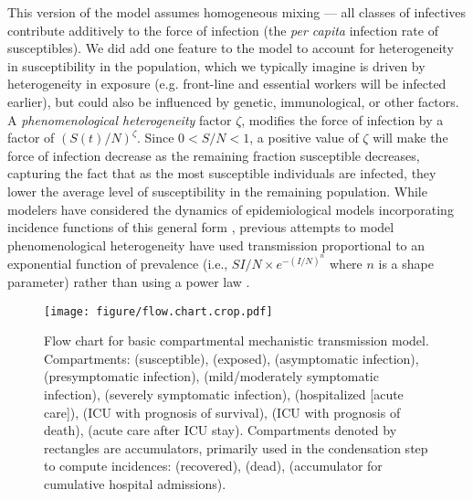 \documentclass[12pt]{article}\usepackage[]{graphicx}\usepackage[]{color}
\begin{document}
This version of the model assumes homogeneous mixing --- all classes of infectives contribute additively to the force of infection (the \emph{per capita} infection rate of susceptibles).
We did add one feature to the model to account for heterogeneity in susceptibility in the population, which we typically imagine is driven by heterogeneity in exposure (e.g. front-line and essential workers will be infected earlier), but could also be influenced by genetic, immunological, or other factors.
A \emph{phenomenological heterogeneity} factor $\zeta$, modifies the force of infection by a factor of $\left(S(t)/N\right)^\zeta$. Since $0 < S/N < 1$, a positive value of $\zeta$ will make the force of infection decrease as the remaining fraction susceptible decreases, capturing the fact that as the most susceptible individuals are infected, they lower the average level of susceptibility in the remaining population. While modelers have considered the dynamics of epidemiological models incorporating incidence functions of this general form \cite{WilsWorc+45,Liu+87}, previous attempts to model phenomenological heterogeneity have used transmission proportional to an exponential function of prevalence (i.e., $S I/N \times e^{-(I/N)^n}$ where $n$ is a shape parameter) rather than using a power law \cite{Will+06,Gran+09}. 

\begin{figure}
\color{fgcolor}
\texttt{[image: figure/flow.chart.crop.pdf]}
\caption{Flow chart for basic compartmental mechanistic transmission model. 
Compartments:  (susceptible),  (exposed),  (asymptomatic infection),  (presymptomatic infection),  (mild/moderately symptomatic infection),  (severely symptomatic infection),  (hospitalized [acute care]),  (ICU with prognosis of survival),  (ICU with prognosis of death),  (acute care after ICU stay). 
Compartments denoted by rectangles are accumulators, primarily used in the condensation step to compute incidences:  (recovered),  (dead),  (accumulator for cumulative hospital admissions).
}
\label{fig:flowchart}
\end{figure}

\end{document}
